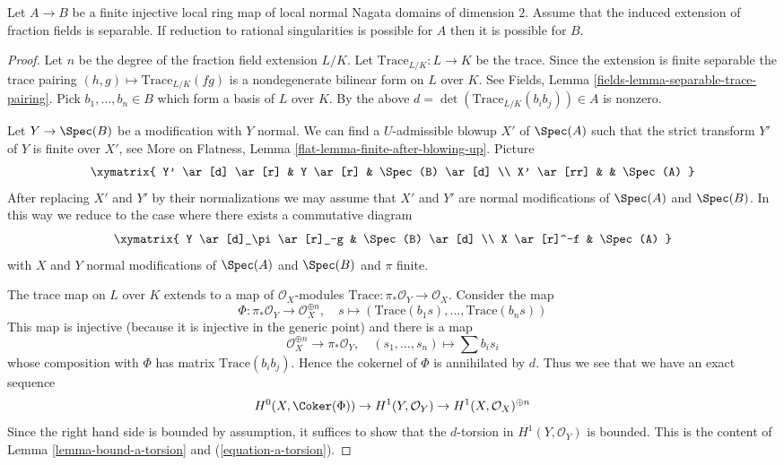 \begin{lemma}
\label{lemma-go-up-separable}
Let $A \to B$ be a finite injective local ring map of local normal
Nagata domains of dimension $2$. Assume that the induced extension of
fraction fields is separable. If reduction to rational singularities
is possible for $A$ then it is possible for $B$.
\end{lemma}

\begin{proof}
Let $n$ be the degree of the fraction field extension $L/K$.
Let $\text{Trace}_{L/K} : L \to K$ be the trace. Since the extension is finite
separable the trace pairing $(h, g) \mapsto \text{Trace}_{L/K}(fg)$
is a nondegenerate bilinear form on $L$ over $K$. See
Fields, Lemma \ref{fields-lemma-separable-trace-pairing}.
Pick $b_1, \ldots, b_n \in B$ which form a basis of $L$ over $K$.
By the above $d = \det(\text{Trace}_{L/K}(b_ib_j)) \in A$ is nonzero.

\medskip\noindent
Let $Y \to \Spec(B)$ be a modification with $Y$ normal. We can find
a $U$-admissible blowup $X'$ of $\Spec(A)$ such that the strict transform
$Y'$ of $Y$ is finite over $X'$, see More on Flatness, Lemma
\ref{flat-lemma-finite-after-blowing-up}. Picture
$$
\xymatrix{
Y' \ar[d] \ar[r] & Y \ar[r] & \Spec(B) \ar[d] \\
X' \ar[rr] & & \Spec(A)
}
$$
After replacing $X'$ and $Y'$ by their normalizations we may assume that
$X'$ and $Y'$ are normal modifications of $\Spec(A)$ and $\Spec(B)$.
In this way we reduce to the case where there exists a commutative diagram
$$
\xymatrix{
Y \ar[d]_\pi \ar[r]_-g & \Spec(B) \ar[d] \\
X \ar[r]^-f & \Spec(A)
}
$$
with $X$ and $Y$ normal modifications of $\Spec(A)$ and $\Spec(B)$ and
$\pi$ finite.

\medskip\noindent
The trace map on $L$ over $K$ extends to a map of $\mathcal{O}_X$-modules
$\text{Trace} : \pi_*\mathcal{O}_Y \to \mathcal{O}_X$. Consider the map
$$
\Phi : \pi_*\mathcal{O}_Y \longrightarrow \mathcal{O}_X^{\oplus n},\quad
s \longmapsto (\text{Trace}(b_1s), \ldots, \text{Trace}(b_ns))
$$
This map is injective (because it is injective in the generic point)
and there is a map
$$
\mathcal{O}_X^{\oplus n} \longrightarrow \pi_*\mathcal{O}_Y,\quad
(s_1, \ldots, s_n) \longmapsto \sum b_i s_i
$$
whose composition with $\Phi$ has matrix $\text{Trace}(b_ib_j)$.
Hence the cokernel of $\Phi$ is annihilated by $d$. Thus we see that
we have an exact sequence
$$
H^0(X, \Coker(\Phi)) \to H^1(Y, \mathcal{O}_Y) \to
H^1(X, \mathcal{O}_X)^{\oplus n}
$$
Since the right hand side is bounded by assumption, it suffices to show
that the $d$-torsion in $H^1(Y, \mathcal{O}_Y)$ is bounded.
This is the content of Lemma \ref{lemma-bound-a-torsion} and
(\ref{equation-a-torsion}).
\end{proof}

